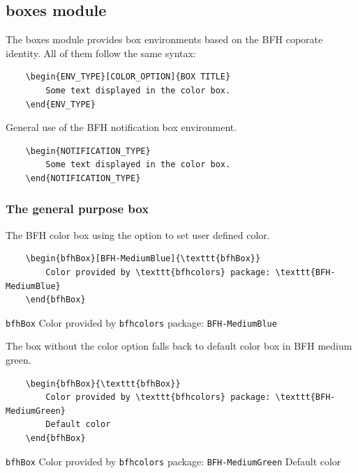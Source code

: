 \documentclass[
]{bfhpub}				%
\begin{document}
\subsection{boxes module}

The boxes module provides box environments based on the BFH coporate identity.
All of them follow the same syntax:

\begin{verbatim}
	\begin{ENV_TYPE}[COLOR_OPTION]{BOX TITLE}
		Some text displayed in the color box.
	\end{ENV_TYPE}
\end{verbatim}

General use of the BFH notification box environment.
\begin{verbatim}
	\begin{NOTIFICATION_TYPE}
		Some text displayed in the color box.
	\end{NOTIFICATION_TYPE}
\end{verbatim}


\subsubsection{The general purpose box}
The BFH color box using the option to set user defined color.

\begin{verbatim}
	\begin{bfhBox}[BFH-MediumBlue]{\texttt{bfhBox}}
		Color provided by \texttt{bfhcolors} package: \texttt{BFH-MediumBlue}
	\end{bfhBox}
\end{verbatim}


\begin{bfhBox}{\texttt{bfhBox}}
	Color provided by \texttt{bfhcolors} package: \texttt{BFH-MediumBlue}
\end{bfhBox}

The box without the color option falls back to default color box in BFH medium green.

\begin{verbatim}
	\begin{bfhBox}{\texttt{bfhBox}}
		Color provided by \texttt{bfhcolors} package: \texttt{BFH-MediumGreen}
		Default color
	\end{bfhBox}
\end{verbatim}

\begin{bfhBox}{\texttt{bfhBox}}
	Color provided by \texttt{bfhcolors} package: \texttt{BFH-MediumGreen}
	Default color
\end{bfhBox}
\end{document}
